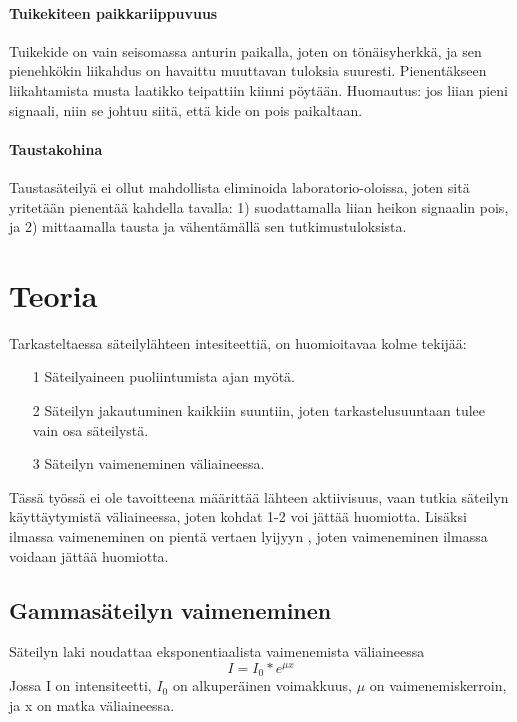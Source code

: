 \documentclass[a4paper, 12pt]{article}
\begin{document}
\paragraph{Tuikekiteen paikkariippuvuus\\}
Tuikekide on vain seisomassa anturin paikalla, joten on tönäisyherkkä, ja sen pienehkökin liikahdus on havaittu muuttavan tuloksia suuresti. Pienentäkseen liikahtamista musta laatikko teipattiin kiinni pöytään. Huomautus: jos liian pieni signaali, niin se johtuu siitä, että kide on pois paikaltaan.

\paragraph{Taustakohina\\}
Taustasäteilyä ei ollut mahdollista eliminoida laboratorio-oloissa, joten sitä yritetään pienentää kahdella tavalla: 1) suodattamalla liian heikon signaalin pois, ja 2) mittaamalla tausta ja vähentämällä sen tutkimustuloksista.

\section{Teoria}

Tarkasteltaessa säteilylähteen intesiteettiä, on huomioitavaa kolme tekijää:
\begin{enumerate}
\item[1] Säteilyaineen puoliintumista ajan myötä.
\item[2] Säteilyn jakautuminen kaikkiin suuntiin, joten tarkastelusuuntaan tulee vain osa säteilystä.
\item[3] Säteilyn vaimeneminen väliaineessa.
\end{enumerate}

Tässä työssä ei ole tavoitteena määrittää lähteen aktiivisuus, vaan tutkia säteilyn käyttäytymistä väliaineessa, joten kohdat 1-2 voi jättää huomiotta. Lisäksi ilmassa vaimeneminen on pientä vertaen lyijyyn \cite{GammaLead} \cite{GammaAir}, joten vaimeneminen ilmassa voidaan jättää huomiotta.

\subsection{Gammasäteilyn vaimeneminen}

Säteilyn laki noudattaa eksponentiaalista vaimenemista väliaineessa \cite{Vaimeneminen}
\begin{equation}
I = I_0 * e^{\mu x}
\label{eq:SateilynVaimeneminen}
\end{equation}
Jossa I on intensiteetti, $I_0$ on alkuperäinen voimakkuus, $\mu$ on vaimenemiskerroin, ja x on matka väliaineessa.
\end{document}
